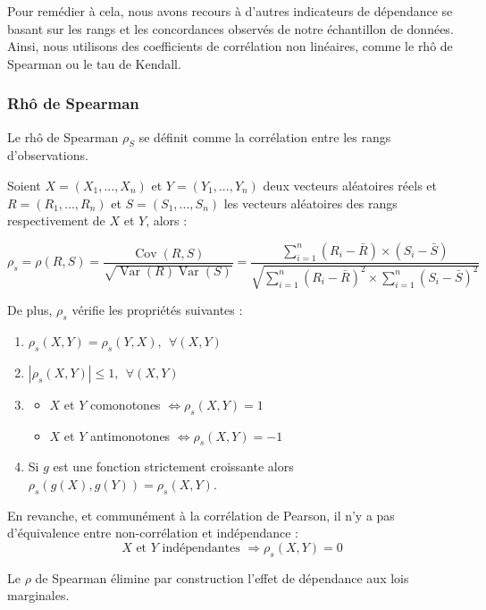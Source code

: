 Pour remédier à cela, nous avons recours à d’autres indicateurs de dépendance se basant sur les rangs et les concordances observés de notre échantillon de données. 
Ainsi, nous utilisons des coefficients de corrélation non linéaires, comme le rhô de Spearman ou le tau de Kendall.

\subsubsection{Rhô de Spearman}

Le rhô de Spearman $\rho_S$ se définit comme la corrélation entre les rangs d'observations.

Soient $X=(X_1,...,X_n)$ et $Y=(Y_1,...,Y_n)$ deux vecteurs aléatoires réels et $R = (R_1,...,R_n)$ et $S = (S_1,...,S_n)$ les vecteurs aléatoires des rangs respectivement
de $X$ et $Y$, alors :

$$
\rho_s = \rho(R,S) = \frac{\operatorname{Cov}(R,S)}{\sqrt{ \operatorname{Var}(R) \operatorname{Var}(S)}} = \frac{ \sum_{i=1}^n (R_i - \bar{R}) \times (S_i - \bar{S})  }{ \sqrt{   \sum_{i=1}^n (R_i - \bar{R})^2 \times  \sum_{i=1}^n (S_i - \bar{S})^2    }    }
$$

De plus, $\rho_s$ vérifie les propriétés suivantes :

\begin{enumerate}

\item $\rho_s(X,Y) = \rho_s(Y,X), ~~\forall (X,Y)$
\item $|\rho_s(X,Y)| \leq 1, ~~\forall (X,Y)$
\item 
\begin{itemize}
\item $X$ et $Y$ comonotones $\Longleftrightarrow \rho_s(X,Y)=1$
\item $X$ et $Y$ antimonotones $\Longleftrightarrow \rho_s(X,Y)=-1$
\end{itemize}
\item Si $g$ est une fonction strictement croissante alors $\rho_s(g(X),g(Y))=\rho_s(X,Y)$.

\end{enumerate}

En revanche, et communément à la corrélation de Pearson, il n’y a pas d’équivalence entre non-corrélation et indépendance :
$$
X \text{~et~} Y \text{~indépendantes~} \Longrightarrow \rho_s(X,Y) = 0
$$
	
Le $\rho$ de Spearman élimine par construction l’effet de dépendance aux lois marginales.

